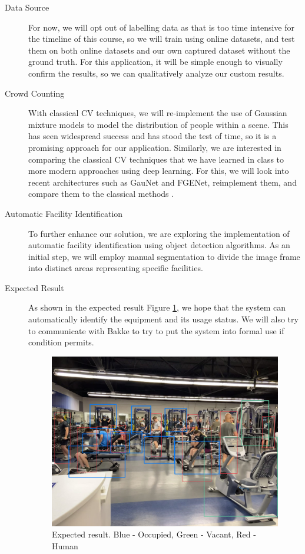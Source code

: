 \documentclass{article}
\begin{document}
\begin{description}
\item[Data Source] For now, we will opt out of labelling data as that is too time intensive for the timeline of this course, so we will train using online datasets, and test them on both online datasets\cite{virat,https://doi.org/10.17632/xh6m6gxhvj.1} and our own captured dataset without the ground truth. For this application, it will be simple enough to visually confirm the results, so we can qualitatively analyze our custom results. 
\item[Crowd Counting] With classical CV techniques, we will re-implement the use of Gaussian mixture models to model the distribution of people within a scene. This has seen widespread success and has stood the test of time, so it is a promising approach for our application. Similarly, we are interested in comparing the classical CV techniques that we have learned in class to more modern approaches using deep learning. For this, we will look into recent architectures such as GauNet and FGENet, reimplement them, and compare them to the classical methods \cite{CNN, 9321733}.
\item[Automatic Facility Identification] To further enhance our solution, we are exploring the implementation of automatic facility identification using object detection algorithms. As an initial step, we will employ manual segmentation to divide the image frame into distinct areas representing specific facilities.
\item[Expected Result] As shown in the expected result Figure \ref{fig:expected}, we hope that the system can automatically identify the equipment and its usage status. We will also try to communicate with Bakke to try to put the system into formal use if condition permits.
\begin{figure}[ht]
    \centering
    \includegraphics[width=0.8\linewidth]{expected.jpg}
    \caption{Expected result. Blue - Occupied, Green - Vacant, Red - Human}
    \label{fig:expected}
\end{figure}
\end{description}
\end{document}
